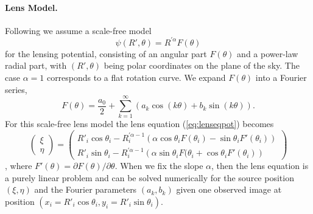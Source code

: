 \paragraph{Lens Model.} Following \citet{EvansWitt} we assume a scale-free model
\begin{equation}
\psi(R',\theta) = R^{'\alpha} F(\theta) \label{eq:scalefreemodel}
\end{equation}
for the lensing potential, consisting of an angular part $F(\theta)$ and a power-law radial part, with $(R',\theta)$ being polar coordinates on the plane of the sky. The case $\alpha = 1$ corresponds to a flat rotation curve. We expand $F(\theta)$ into a Fourier series,
\begin{equation}
F(\theta) = \frac{a_0}{2} + \sum_{k=1}^{\infty} \left(a_k \cos(k\theta) + b_k \sin (k\theta) \right). \label{eq:Fourieransatz}
\end{equation}
For this scale-free lens model the lens equation (\ref{eq:lenseqpot}) becomes
\begin{equation}
\begin{pmatrix} \xi \\ \eta \end{pmatrix} = \begin{pmatrix} R'_i \cos \theta_i - R_i^{'\alpha-1} \left(\alpha \cos \theta_i F(\theta_i) - \sin \theta_i F'(\theta_i) \right) \\ R'_i \sin \theta_i - R_i^{'\alpha-1} \left(\alpha \sin \theta_i F(\theta_i + \cos \theta_i F'(\theta_i) \right)\end{pmatrix}\label{eq:Fourierlenseq}
\end{equation}
\citep{EvansWitt}, where $F'(\theta) = \partial F(\theta) / \partial \theta$. When we fix the slope $\alpha$, then the lens equation is a purely linear problem and can be solved numerically for the source position $(\xi,\eta)$ and the Fourier parameters $(a_k,b_k)$ given one observed image at position $(x_i=R'_i \cos \theta_i,y_i=R'_i \sin \theta_i)$. 

